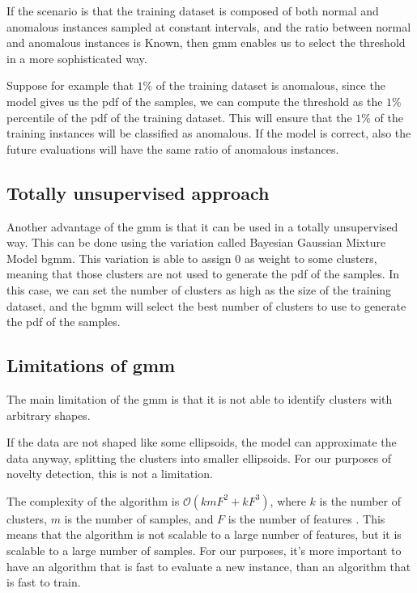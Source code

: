 If the scenario is that the training dataset is composed of both normal and anomalous instances sampled at constant intervals, and the ratio between normal and anomalous instances is Known, then \gls{gmm} enables us to select the threshold in a more sophisticated way.

Suppose for example that $1\%$ of the training dataset is anomalous, since the model gives us the \gls{pdf} of the samples, we can compute the threshold as the $1\%$ percentile of the \gls{pdf} of the training dataset. This will ensure that the $1\%$ of the training instances will be classified as anomalous. If the model is correct, also the future evaluations will have the same ratio of anomalous instances.

\subsection{Totally unsupervised approach}
\label{sec:gauss_unsupervised}
Another advantage of the \gls{gmm} is that it can be used in a totally unsupervised way. This can be done using the variation called Bayesian Gaussian Mixture Model \gls{bgmm}. This variation is able to assign $0$ as 
weight to some clusters, meaning that those clusters are not used to generate the \gls{pdf} of the samples. In this case, we can set the number of clusters as high as the size of the training dataset, and the \gls{bgmm} will select the best number of clusters to use to generate the \gls{pdf} of the samples. 

\subsection{Limitations of \gls{gmm}}
The main limitation of the \gls{gmm} is that it is not able to identify clusters with arbitrary shapes.

If the data are not shaped like some ellipsoids, the model can approximate the data anyway, splitting the clusters into smaller ellipsoids. For our purposes of novelty detection, this is not a limitation.

The complexity of the algorithm is $\mathcal{O}(kmF^2+kF^3)$, where $k$ is the number of clusters, $m$ is the number of samples, and $F$ is the number of features . This means that the algorithm is not scalable to a large number of features, but it is scalable to a large number of samples.
For our purposes, it's more important to have an algorithm that is fast to evaluate a new instance, than an algorithm that is fast to train.